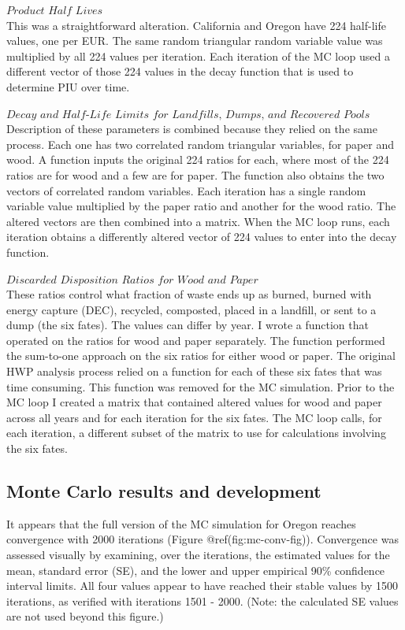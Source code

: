 \documentclass[
  openany]{book}
\begin{document}
\(\textit{Product Half Lives}\)\\
This was a straightforward alteration. California and Oregon have 224
half-life values, one per EUR. The same random triangular random
variable value was multiplied by all 224 values per iteration. Each
iteration of the MC loop used a different vector of those 224 values in
the decay function that is used to determine PIU over time.

\(\textit{Decay and Half-Life Limits for Landfills, Dumps, and Recovered Pools}\)\\
Description of these parameters is combined because they relied on the
same process. Each one has two correlated random triangular variables,
for paper and wood. A function inputs the original 224 ratios for each,
where most of the 224 ratios are for wood and a few are for paper. The
function also obtains the two vectors of correlated random variables.
Each iteration has a single random variable value multiplied by the
paper ratio and another for the wood ratio. The altered vectors are then
combined into a matrix. When the MC loop runs, each iteration obtains a
differently altered vector of 224 values to enter into the decay
function.

\(\textit{Discarded Disposition Ratios for Wood and Paper}\)\\
These ratios control what fraction of waste ends up as burned, burned
with energy capture (DEC), recycled, composted, placed in a landfill, or
sent to a dump (the six fates). The values can differ by year. I wrote a
function that operated on the ratios for wood and paper separately. The
function performed the sum-to-one approach on the six ratios for either
wood or paper. The original HWP analysis process relied on a function
for each of these six fates that was time consuming. This function was
removed for the MC simulation. Prior to the MC loop I created a matrix
that contained altered values for wood and paper across all years and
for each iteration for the six fates. The MC loop calls, for each
iteration, a different subset of the matrix to use for calculations
involving the six fates.

\hypertarget{model-mc-res}{%
\subsection{Monte Carlo results and development}\label{model-mc-res}}

It appears that the full version of the MC simulation for Oregon reaches
convergence with 2000 iterations (Figure @ref(fig:mc-conv-fig)).
Convergence was assessed visually by examining, over the iterations, the
estimated values for the mean, standard error (SE), and the lower and
upper empirical 90\% confidence interval limits. All four values appear
to have reached their stable values by 1500 iterations, as verified with
iterations 1501 - 2000. (Note: the calculated SE values are not used
beyond this figure.)
\end{document}
